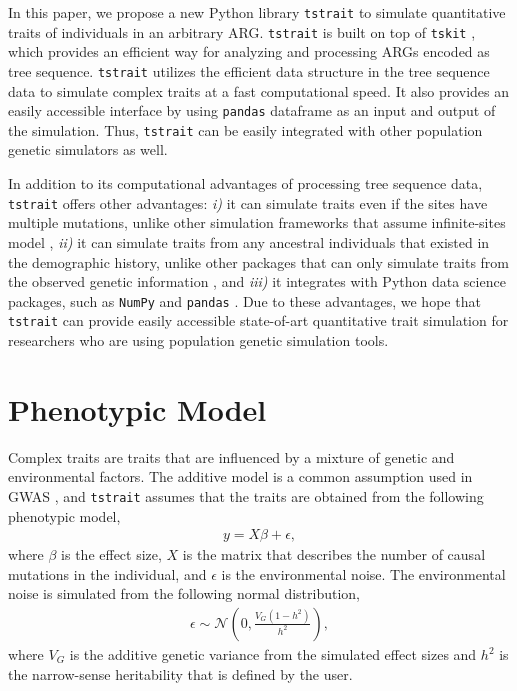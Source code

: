 \documentclass[unnumsec,webpdf,modern,large,namedate]{oup-authoring-template}%
\begin{document}
In this paper, we propose a new Python library \texttt{tstrait} to simulate
quantitative traits of individuals in an arbitrary ARG. \texttt{tstrait} is
built on top of \texttt{tskit} \citep{ralph2020}, which provides an efficient
way for analyzing and processing ARGs encoded as tree sequence.
\texttt{tstrait} utilizes the efficient data structure in the tree sequence
data to simulate complex traits at a fast computational speed. It also provides
an easily accessible interface by using \texttt{pandas} dataframe
\citep{pandas} as an input and output of the simulation. Thus, \texttt{tstrait}
can be easily integrated with other population genetic simulators as well.

In addition to its computational advantages of processing tree sequence data,
\texttt{tstrait} offers other advantages: \emph{i)} it can simulate traits even
if the sites have multiple mutations, unlike other simulation frameworks that
assume infinite-sites model \citep{martin2017}, \emph{ii)} it can simulate
traits from any ancestral individuals that existed in the demographic history,
unlike other packages that can only simulate traits from the observed genetic
information \citep{fernandes2020,meyer2018}, and \emph{iii)} it integrates with
Python data science packages, such as \texttt{NumPy} \citep{numpy} and
\texttt{pandas} \citep{pandas}. Due to these advantages, we hope that
\texttt{tstrait} can provide easily accessible state-of-art quantitative trait
simulation for researchers who are using population genetic simulation tools.

\section{Phenotypic Model}

Complex traits are traits that are influenced by a mixture of genetic and
environmental factors. The additive model is a common assumption used in GWAS
\citep{uffelmann2021}, and \texttt{tstrait} assumes that the traits are
obtained from the following phenotypic model,
\begin{align}\label{eq:additive-model}
    y=X\beta+\epsilon,
\end{align}
where $\beta$ is the effect size, $X$ is the matrix that describes the number
of causal mutations in the individual, and $\epsilon$ is the environmental
noise. The environmental noise is simulated from the following normal
distribution,
\begin{align}\label{eq:env}
    \epsilon\sim \mathcal{N}\left(0,\frac{V_G(1-h^2)}{h^2}\right),
\end{align}
where $V_G$ is the additive genetic variance from the simulated effect sizes
and $h^2$ is the narrow-sense heritability that is defined by the user.
\end{document}
